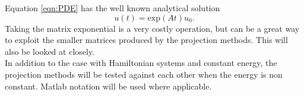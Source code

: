 Equation \eqref{eqn:PDE} has the well known analytical solution 
\begin{equation*}
u(t) = \text{exp}(At)u_0.
\end{equation*}
Taking the matrix exponential is a very costly operation, but can be a great way to exploit the smaller matrices produced by the projection methods. This will also be looked at closely.\\
In addition to the case with Hamiltonian systems and constant energy, the projection methods will be tested against each other when the energy is non constant.
Matlab notation will be used where applicable.\\
